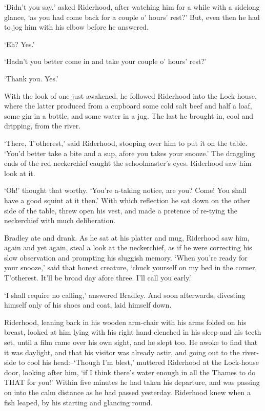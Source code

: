 ‘Didn’t you say,’ asked Riderhood, after watching him for a while with
a sidelong glance, ‘as you had come back for a couple o’ hours’ rest?’
But, even then he had to jog him with his elbow before he answered.

‘Eh? Yes.’

‘Hadn’t you better come in and take your couple o’ hours’ rest?’

‘Thank you. Yes.’

With the look of one just awakened, he followed Riderhood into the
Lock-house, where the latter produced from a cupboard some cold salt
beef and half a loaf, some gin in a bottle, and some water in a jug. The
last he brought in, cool and dripping, from the river.

‘There, T’otherest,’ said Riderhood, stooping over him to put it on
the table. ‘You’d better take a bite and a sup, afore you takes
your snooze.’ The draggling ends of the red neckerchief caught the
schoolmaster’s eyes. Riderhood saw him look at it.

‘Oh!’ thought that worthy. ‘You’re a-taking notice, are you? Come! You
shall have a good squint at it then.’ With which reflection he sat down
on the other side of the table, threw open his vest, and made a pretence
of re-tying the neckerchief with much deliberation.

Bradley ate and drank. As he sat at his platter and mug, Riderhood saw
him, again and yet again, steal a look at the neckerchief, as if he were
correcting his slow observation and prompting his sluggish memory.
‘When you’re ready for your snooze,’ said that honest creature, ‘chuck
yourself on my bed in the corner, T’otherest. It’ll be broad day afore
three. I’ll call you early.’

‘I shall require no calling,’ answered Bradley. And soon afterwards,
divesting himself only of his shoes and coat, laid himself down.

Riderhood, leaning back in his wooden arm-chair with his arms folded
on his breast, looked at him lying with his right hand clenched in his
sleep and his teeth set, until a film came over his own sight, and he
slept too. He awoke to find that it was daylight, and that his
visitor was already astir, and going out to the river-side to cool his
head:--‘Though I’m blest,’ muttered Riderhood at the Lock-house door,
looking after him, ‘if I think there’s water enough in all the Thames
to do THAT for you!’ Within five minutes he had taken his departure,
and was passing on into the calm distance as he had passed yesterday.
Riderhood knew when a fish leaped, by his starting and glancing round.

